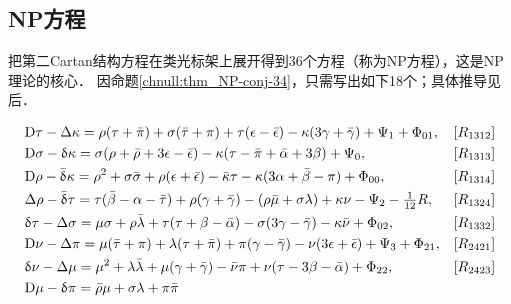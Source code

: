 
\subsection{NP方程}
把第二Cartan结构方程在类光标架上展开得到36个方程（称为NP方程），这是NP理论的核心．
因命题\ref{chnull:thm_NP-conj-34}，只需写出如下18个；具体推导见后．
\begin{small}  %
\begin{subequations}\label{chnull:eqn_NP-all}
    \begin{align}
        &{\rm D}\tau -\Delta \kappa =  \rho(\tau +\bar{\pi }) +\sigma(\bar{\tau }+\pi )
        +\tau(\epsilon -\bar{\epsilon }) - \kappa(3\gamma +\bar{\gamma } )
        +\Psi _{1} +\Phi_{01},   & [R_{1312}] \label{chnull:eqn_NP-all-R1312} \\
        &{\rm D}\sigma -\updelta \kappa = \sigma(\rho +\bar{\rho } + 3\epsilon - \bar{\epsilon })
        -\kappa(\tau -\bar{\pi }+\bar{\alpha } +3\beta ) +\Psi_{0},
        &[R_{1313}] \label{chnull:eqn_NP-all-R1313} \\
        &{\rm D}\rho -\bar{\updelta }\kappa =  \rho ^{2}+\sigma \bar{\sigma }
        + \rho(\epsilon+\bar{\epsilon }) -\bar{\kappa }\tau
        -\kappa (3\alpha +\bar{\beta }-\pi ) +\Phi_{00},
        &[R_{1314}] \label{chnull:eqn_NP-all-R1314}  \\
        &\Delta \rho -\bar{\updelta }\tau = \tau (\bar{\beta }
        -\alpha -\bar{\tau })+\rho(\gamma +\bar{\gamma })-(\rho \bar{\mu }+\sigma \lambda )
        +\kappa \nu  -\Psi_{2} - \tfrac{1}{12}R,
        & [R_{1324}] \label{chnull:eqn_NP-all-R1324} \\
        &\updelta \tau -\Delta \sigma =\mu \sigma +\rho \bar{\lambda }+\tau (\tau +\beta -\bar{\alpha })
        -\sigma (3\gamma -\bar{\gamma } )-\kappa \bar{\nu } + \Phi_{02},
        & [R_{1332}] \label{chnull:eqn_NP-all-R1332} \\
        &{\rm D}\nu -\Delta \pi = \mu(\bar{\tau }+\pi ) + \lambda(\tau +\bar{\pi } )
        + \pi(\gamma -\bar{\gamma }) - \nu(3\epsilon +\bar{\epsilon } )
         + \Psi _{3} +\Phi_{21},   & [R_{2421}] \label{chnull:eqn_NP-all-R2421} \\
        &\updelta \nu -\Delta \mu =\mu ^{2}+\lambda \bar{\lambda }+\mu (\gamma + \bar{\gamma })
        -\bar{\nu }\pi +\nu (\tau -3\beta -\bar{\alpha }) + \Phi_{22},
        & [R_{2423}] \label{chnull:eqn_NP-all-R2423} \\
        &{\rm D}\mu -\updelta \pi =\bar{\rho }\mu +\sigma \lambda +\pi \bar{\pi }

\end{align}
\end{subequations}
\end{small}
